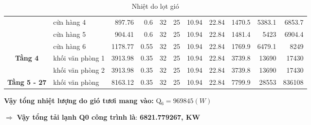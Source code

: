 \begin{landscape}
\begin{table}[H]
\begin{adjustbox}{width=1.5\textheight}
\begin{tabular}{|c|l|r|r|r|r|r|r|r|r|r|}
			\cline{2-11}             & cửa hàng 4 & 897.76   & 0.6      & 32       & 25       & 10.94    & 22.84    & 1470.5   & 5383.1   & 6853.7 \bigstrut\\
			\cline{2-11}             & cửa hàng 5 & 904.41   & 0.6      & 32       & 25       & 10.94    & 22.84    & 1481.4   & 5423     & 6904.4 \bigstrut\\
			\cline{2-11}             & cửa hàng 6 & 1178.77  & 0.55     & 32       & 25       & 10.94    & 22.84    & 1769.9   & 6479.1   & 8249 \bigstrut\\
			\hline
			\multirow{2}[4]{*}{\textbf{Tầng 4}} & khối văn phòng 1 & 3913.98  & 0.35     & 32       & 25       & 10.94    & 22.84    & 3739.8   & 13690    & 17430 \bigstrut\\
			\cline{2-11}             & khối văn phòng 2 & 3913.98  & 0.35     & 32       & 25       & 10.94    & 22.84    & 3739.8   & 13690    & 17430 \bigstrut\\
			\hline
			\textbf{Tầng 5 - 27} & khối văn phòng & 8163.12  & 0.35     & 32       & 25       & 10.94    & 22.84    & 7799.9   & 28553    & 836108 \bigstrut\\
			\hline
		\end{tabular}%
	\end{adjustbox}
		\caption{Nhiệt do lọt gió}
		\label{b:ndlg}%
	\end{table}%
\end{landscape}
\textbf{Vậy tổng nhiệt lượng do gió tươi mang vào:} Q$_{6} = 969845(W)$

$\Rightarrow$ \textbf{Vậy tổng tải lạnh Q{\scriptsize 0} công trình là}: \textbf{6821.779267, KW}






